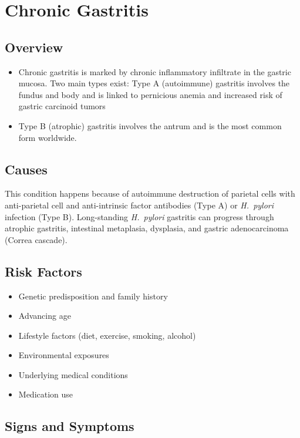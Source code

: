 \chapter{Chronic Gastritis}
\label{sec:Chronic Gastritis}

\section{Overview}


\begin{itemize}[noitemsep]
  \item Chronic gastritis is marked by chronic inflammatory infiltrate in the gastric mucosa. Two main types exist: Type A (autoimmune) gastritis involves the fundus and body and is linked to pernicious anemia and increased risk of gastric carcinoid tumors
  \item Type B (atrophic) gastritis involves the antrum and is the most common form worldwide.
\end{itemize}
\section{Causes}
This condition happens because of autoimmune destruction of parietal cells with anti-parietal cell and anti-intrinsic factor antibodies (Type A) or \textit{H.~pylori} infection (Type B). Long-standing \textit{H.~pylori} gastritis can progress through atrophic gastritis, intestinal metaplasia, dysplasia, and gastric adenocarcinoma (Correa cascade).     
\section{Risk Factors}

\begin{itemize}[noitemsep]
  \item Genetic predisposition and family history
  \item Advancing age
  \item Lifestyle factors (diet, exercise, smoking, alcohol)
  \item Environmental exposures
  \item Underlying medical conditions
  \item Medication use
\end{itemize}
\section{Signs and Symptoms}

